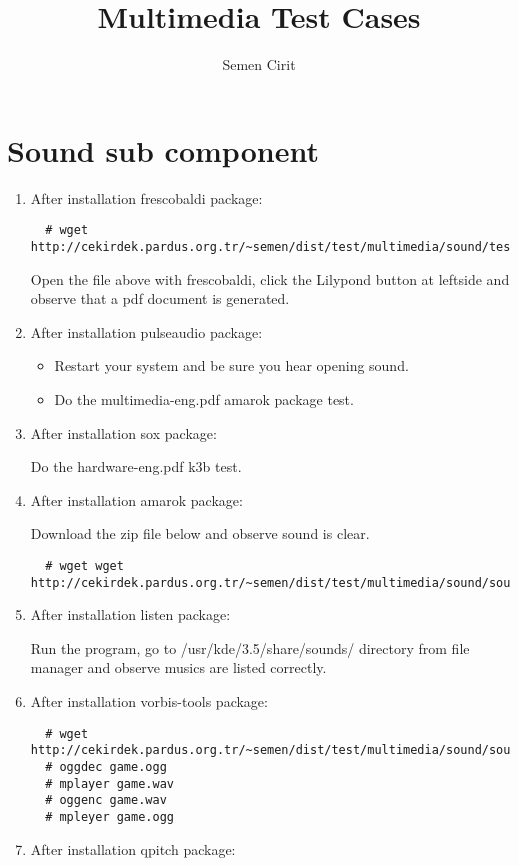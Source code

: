 \documentclass[a4paper,10pt]{article}
\title{Multimedia Test Cases}
\author{Semen Cirit}
\begin{document}
\maketitle

\section{Sound sub component}
\begin{enumerate}
\item After installation frescobaldi package:
 \begin{verbatim}
  # wget http://cekirdek.pardus.org.tr/~semen/dist/test/multimedia/sound/test_frescobaldi.ly
 \end{verbatim}
Open the file above with frescobaldi, click the Lilypond button at leftside and observe that a pdf document is generated.
\item After installation pulseaudio package:
\begin{itemize}
 \item Restart your system and be sure you hear opening sound.
 \item Do the multimedia-eng.pdf amarok package test.
\end{itemize}
\item After installation sox package:

Do the hardware-eng.pdf k3b test.
\item After installation amarok package:
 
Download the zip file below and observe sound is clear.
 \begin{verbatim}
  # wget wget http://cekirdek.pardus.org.tr/~semen/dist/test/multimedia/sound/sound.tar
 \end{verbatim}

\item After installation listen package: 

Run the program, go to /usr/kde/3.5/share/sounds/ directory from file manager and observe musics are listed correctly.

\item After installation vorbis-tools package: 
 \begin{verbatim}
  # wget http://cekirdek.pardus.org.tr/~semen/dist/test/multimedia/sound/sound/game.ogg
  # oggdec game.ogg
  # mplayer game.wav
  # oggenc game.wav
  # mpleyer game.ogg
 \end{verbatim}

\item After installation qpitch package:


\end{enumerate}
\end{document}
